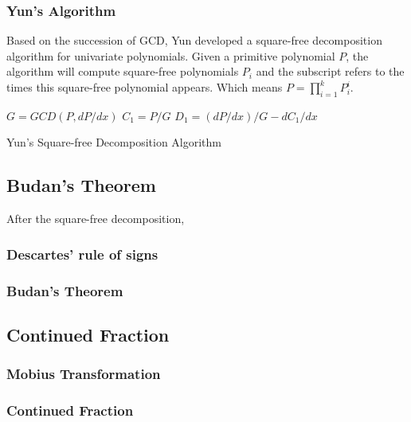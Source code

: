 \subsubsection{Yun's Algorithm}

Based on the succession of GCD, Yun developed a square-free decomposition
algorithm for univariate polynomials. Given a primitive polynomial $P$, the
algorithm will compute square-free polynomials $P_i$ and the subscript refers to
the times this square-free polynomial appears. Which means $P= \prod_{i=1}^k
P_i^i$.

\begin{algorithm}[H]
\label{alg2}
\SetAlgoLined


  $G = GCD(P, dP/dx)$\;
  $C_1=P/G$\;
  $D_1 = (dP/dx)/G - dC_1/dx$\;



\caption{Yun's Square-free Decomposition Algorithm}
\end{algorithm}

\subsection{Budan's Theorem}

After the square-free decomposition,

\subsubsection{Descartes' rule of signs}

\subsubsection{Budan's Theorem}

\subsection{Continued Fraction}

\subsubsection{Mobius Transformation}

\subsubsection{Continued Fraction}

